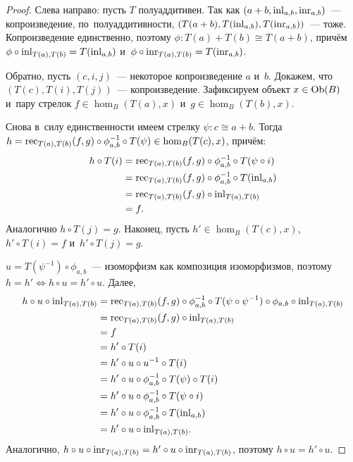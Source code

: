 \documentclass[a4paper,oneside]{article}
\begin{document}
\begin{proof}
    Слева направо: пусть $T$ полуаддитивен. Так как $(a + b,\allowbreak \mathrm{inl}_{a, b},\allowbreak \mathrm{inr}_{a, b})$~— копроизведение,
    по~полуаддитивности, $(T(a + b), T(\mathrm{inl}_{a, b}), T(\mathrm{inr}_{a, b}))$~— тоже.
    Копроизведение единственно, поэтому $\phi : T(a) + T(b) \cong T(a + b)$, причём $\phi \circ \mathrm{inl}_{T(a), T(b)} = T(\mathrm{inl}_{a, b})$
    и~$\phi \circ \mathrm{inr}_{T(a), T(b)} = T(\mathrm{inr}_{a, b})$.

    Обратно, пусть $(c, i, j)$~— некоторое копроизведение $a$ и~$b$. Докажем, что $(T(c), T(i), T(j))$~— копроизведение.
    Зафиксируем объект $x \in \mathrm{Ob}(B)$ и~пару стрелок $f \in \hom_B(T(a), x)$ и~$g \in \hom_B(T(b), x)$.

    Снова в~силу единственности имеем стрелку $\psi : c \cong a + b$.
    Тогда $h = \mathrm{rec}_{T(a), T(b)}(f, g) \circ \phi_{a, b}^{-1} \circ T(\psi) \in \hom_B(T(c), x)$, причём:
    \begin{align*}
        h \circ T(i) &= \mathrm{rec}_{T(a), T(b)}(f, g) \circ \phi_{a, b}^{-1} \circ T(\psi \circ i) \\
                     &= \mathrm{rec}_{T(a), T(b)}(f, g) \circ \phi_{a, b}^{-1} \circ T(\mathrm{inl}_{a, b}) \\
                     &= \mathrm{rec}_{T(a), T(b)}(f, g) \circ \mathrm{inl}_{T(a), T(b)} \\
                     &= f.
    \end{align*}
    Аналогично $h \circ T(j) = g$. Наконец, пусть $h' \in \hom_B(T(c), x)$,
    $h' \circ T(i) = f$ и~$h' \circ T(j) = g$.

    $u = T(\psi^{-1}) \circ \phi_{a, b}$~— изоморфизм как композиция изоморфизмов,
    поэтому $h = h' \Leftrightarrow h \circ u = h' \circ u$. Далее,
    \begin{align*}
        h \circ u \circ \mathrm{inl}_{T(a), T(b)} &= \mathrm{rec}_{T(a), T(b)}(f, g) \circ \phi_{a, b}^{-1} \circ T(\psi \circ \psi^{-1}) \circ \phi_{a, b} \circ \mathrm{inl}_{T(a), T(b)} \\
                                          &= \mathrm{rec}_{T(a), T(b)}(f, g) \circ \mathrm{inl}_{T(a), T(b)} \\
                                          &= f \\
                                          &= h' \circ T(i) \\
                                          &= h' \circ u \circ u^{-1} \circ T(i) \\
                                          &= h' \circ u \circ \phi_{a,b}^{-1} \circ T(\psi) \circ T(i) \\
                                          &= h' \circ u \circ \phi_{a,b}^{-1} \circ T(\psi \circ i) \\
                                          &= h' \circ u \circ \phi_{a,b}^{-1} \circ T(\mathrm{inl}_{a, b}) \\
                                          &= h' \circ u \circ \mathrm{inl}_{T(a), T(b)}.
    \end{align*}
    Аналогично, $h \circ u \circ \mathrm{inr}_{T(a), T(b)} = h' \circ u \circ \mathrm{inr}_{T(a), T(b)}$, поэтому $h \circ u = h' \circ u$.
\end{proof}
\end{document}
